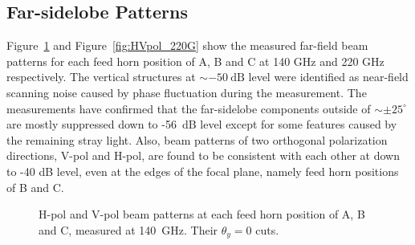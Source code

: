\documentclass[journal]{IEEEtran}
\begin{document}
\subsection{Far-sidelobe Patterns}
%
Figure~\ref{fig:HVpol_140G} and Figure~\ref{fig:HVpol_220G} show the measured far-field beam patterns for each feed horn position of A, B and C at 140 GHz and 220 GHz respectively. The vertical structures at $\sim -50~\mathrm{dB}$ level were identified as near-field scanning noise caused by phase fluctuation during the measurement. The measurements have confirmed that the far-sidelobe components outside of $\sim \pm25^\circ$ are mostly suppressed down to -56~dB level except for some features caused by the remaining stray light. Also, beam patterns of two orthogonal polarization directions, V-pol and H-pol, are found to be consistent with each other at down to -40 dB level, even at the edges of the focal plane, namely feed horn positions of B and C.
%
\begin{figure}[!t]
\centering
{}
\hfil
{}
\caption{%
\protect{} H-pol and V-pol beam patterns at each feed horn position of A, B and C, measured at 140~GHz. \protect{} Their $\theta_y = 0$ cuts.
}
\label{fig:HVpol_140G}
\end{figure}
\end{document}
